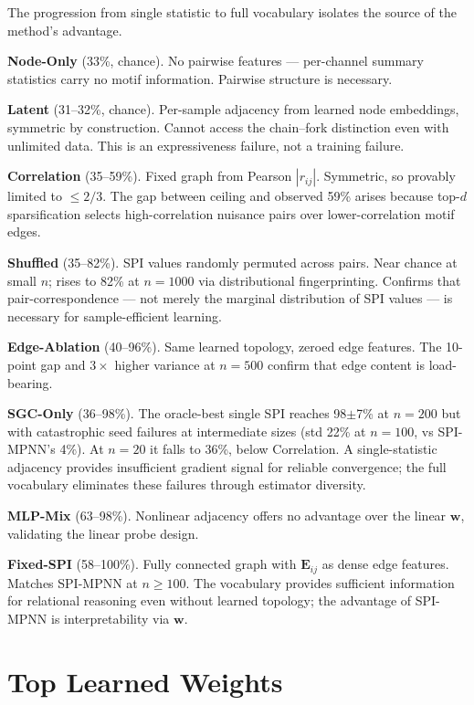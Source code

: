 \documentclass{article}
\begin{document}
The progression from single statistic to full vocabulary isolates the source of the method's advantage.

\textbf{Node-Only} (33\%, chance). No pairwise features --- per-channel summary statistics carry no motif information. Pairwise structure is necessary.

\textbf{Latent} (31--32\%, chance). Per-sample adjacency from learned node embeddings, symmetric by construction. Cannot access the chain--fork distinction even with unlimited data. This is an expressiveness failure, not a training failure.

\textbf{Correlation} (35--59\%). Fixed graph from Pearson $|r_{ij}|$. Symmetric, so provably limited to $\leq 2/3$. The gap between ceiling and observed 59\% arises because top-$d$ sparsification selects high-correlation nuisance pairs over lower-correlation motif edges.

\textbf{Shuffled} (35--82\%). SPI values randomly permuted across pairs. Near chance at small $n$; rises to 82\% at $n{=}1000$ via distributional fingerprinting. Confirms that pair-correspondence --- not merely the marginal distribution of SPI values --- is necessary for sample-efficient learning.

\textbf{Edge-Ablation} (40--96\%). Same learned topology, zeroed edge features. The 10-point gap and $3{\times}$ higher variance at $n{=}500$ confirm that edge content is load-bearing.

\textbf{SGC-Only} (36--98\%). The oracle-best single SPI reaches 98$\pm$7\% at $n{=}200$ but with catastrophic seed failures at intermediate sizes (std 22\% at $n{=}100$, vs SPI-MPNN's 4\%). At $n{=}20$ it falls to 36\%, below Correlation. A single-statistic adjacency provides insufficient gradient signal for reliable convergence; the full vocabulary eliminates these failures through estimator diversity.

\textbf{MLP-Mix} (63--98\%). Nonlinear adjacency offers no advantage over the linear $\mathbf{w}$, validating the linear probe design.

\textbf{Fixed-SPI} (58--100\%). Fully connected graph with $\mathbf{E}_{ij}$ as dense edge features. Matches SPI-MPNN at $n \geq 100$. The vocabulary provides sufficient information for relational reasoning even without learned topology; the advantage of SPI-MPNN is interpretability via $\mathbf{w}$.

\section{Top Learned Weights}
\label{app:weights}
\end{document}
